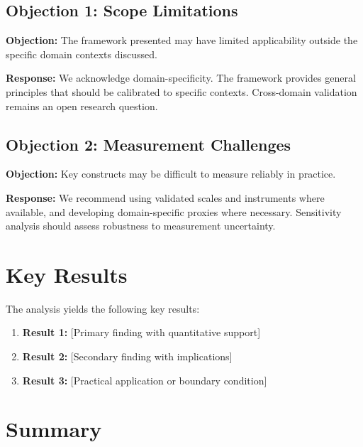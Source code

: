\subsection{Objection 1: Scope Limitations}

\textbf{Objection:} The framework presented may have limited applicability
outside the specific domain contexts discussed.

\textbf{Response:} We acknowledge domain-specificity. The framework provides
general principles that should be calibrated to specific contexts. Cross-domain
validation remains an open research question.

\subsection{Objection 2: Measurement Challenges}

\textbf{Objection:} Key constructs may be difficult to measure reliably in
practice.

\textbf{Response:} We recommend using validated scales and instruments where
available, and developing domain-specific proxies where necessary. Sensitivity
analysis should assess robustness to measurement uncertainty.




\section{Key Results}
\label{sec:vvv5-results}

The analysis yields the following key results:

\begin{enumerate}
    \item \textbf{Result 1:} [Primary finding with quantitative support]
    \item \textbf{Result 2:} [Secondary finding with implications]
    \item \textbf{Result 3:} [Practical application or boundary condition]
\end{enumerate}


\section{Summary}
\label{sec:x-summary}

